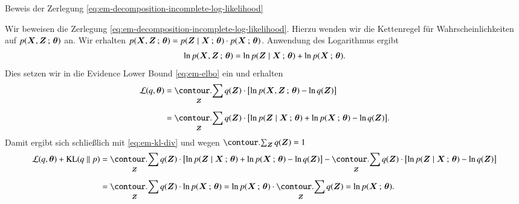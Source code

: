 \begin{frame}{Beweis der Zerlegung \eqref{eq:em-decomposition-incomplete-log-likelihood}}{}
	\begin{myproof}
		Wir beweisen die Zerlegung \eqref{eq:em-decomposition-incomplete-log-likelihood}.
		Hierzu wenden wir die Kettenregel für Wahrscheinlichkeiten auf $p(\bm{X}, \bm{Z} \,;\, \bm{\theta})$ an.
		Wir erhalten $p(\bm{X}, \bm{Z} \,;\, \bm{\theta}) = p(\bm{Z} \mid \bm{X} \,;\, \bm{\theta}) \cdot p(\bm{X} \,;\, \bm{\theta})$.
		Anwendung des Logarithmus ergibt $$\ln p(\bm{X}, \bm{Z} \,;\, \bm{\theta}) = \ln p(\bm{Z} \mid \bm{X} \,;\, \bm{\theta}) + \ln p(\bm{X} \,;\, \bm{\theta}).$$
		Dies setzen wir in die Evidence Lower Bound \eqref{eq:em-elbo} ein und erhalten
		\begin{align*}
			\sL(q, \btheta)
				&= \sum_{\bZ} q(\bZ) \cdot \bigl[ \ln p(\bX, \bZ \param \btheta) - \ln q(\bZ) \bigr]
		\\[2mm]
				&= \sum_{\bZ} q(\bZ) \cdot \bigl[ \ln p(\bZ \mid \bX \param \btheta) + \ln p(\bX \param \btheta) - \ln q(\bZ) \bigr].
		\end{align*}
		Damit ergibt sich schließlich mit \eqref{eq:em-kl-div} und wegen $\sum_{\bZ} q(\bZ) = 1$
		\begin{align*}
			\sL(q, \btheta) + \KL(q \parallel p)
				&= \sum_{\bZ} q(\bZ) \cdot \bigl[ \ln p(\bZ \mid \bX \param \btheta) + \ln p(\bX \param \btheta) - \ln q(\bZ) \bigr]
					- \sum_{\bZ} q(\bZ) \cdot \bigl[ \ln p(\bZ \mid \bX \param \btheta) - \ln q(\bZ) \bigr]
		\\[2mm]
				&= \sum_{\bZ} q(\bZ) \cdot \ln p(\bX \param \btheta) = \ln p(\bX \param \btheta) \cdot \sum_{\bZ} q(\bZ) = \ln p(\bX \param \btheta).
		\end{align*}
	\end{myproof}
\end{frame}


